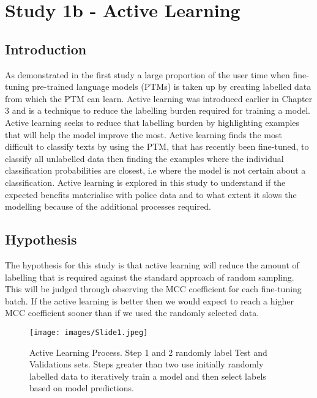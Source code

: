 \chapter{Study 1b - Active Learning}


\section{Introduction} As demonstrated in the first study a large proportion of the user time when fine-tuning pre-trained language models (PTMs) is taken up by creating labelled data from which the PTM can learn. Active learning was introduced earlier in Chapter 3 and is a technique to reduce the labelling burden required for training a model. Active learning seeks to reduce that labelling burden by highlighting examples that will help the model improve the most. Active learning finds the most difficult to classify texts by using the PTM, that has recently been fine-tuned, to classify all unlabelled data then finding the examples where the individual classification probabilities are closest, i.e where the model is not certain about a classification.  Active learning is explored in this study to understand if the expected benefits materialise with police data and to what extent it slows the modelling because of the additional processes required.

\section{Hypothesis}

The hypothesis for this study is that active learning will reduce the amount of labelling that is required against the standard approach of random sampling. This will be judged through observing the MCC coefficient for each fine-tuning batch. If the active learning is better then we would expect to reach a higher MCC coefficient sooner than if we used the randomly selected data.

\begin{figure}[!tbp]
  \centering
    \texttt{[image: images/Slide1.jpeg]}
    \caption{Active Learning Process. Step 1 and 2 randomly label Test and Validations sets. Steps greater than two use initially randomly labelled data to iteratively train a model and then select labels based on model predictions.}
    \label{fig:active_process}
\end{figure}


